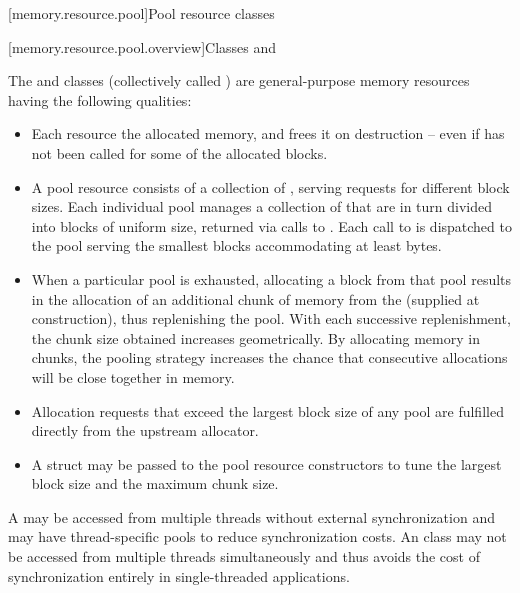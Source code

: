 [memory.resource.pool]{Pool resource classes}

[memory.resource.pool.overview]{Classes  and }

\pnum
The  and
 classes
(collectively called )
are general-purpose memory resources having the following qualities:
\begin{itemize}
\item
Each resource  the allocated memory, and frees it on destruction --
even if  has not been called for some of the allocated blocks.
\item
A pool resource consists of a collection of ,
serving requests for different block sizes.
Each individual pool manages a collection of 
that are in turn divided into blocks of uniform size,
returned via calls to .
Each call to  is dispatched
to the pool serving the smallest blocks accommodating at least  bytes.
\item
When a particular pool is exhausted,
allocating a block from that pool results in the allocation
of an additional chunk of memory from the 
(supplied at construction), thus replenishing the pool.
With each successive replenishment,
the chunk size obtained increases geometrically.
\enternote
By allocating memory in chunks,
the pooling strategy increases the chance that consecutive allocations
will be close together in memory.\exitnote
\item
Allocation requests that exceed the largest block size of any pool
are fulfilled directly from the upstream allocator.
\item
A  struct may be passed to the pool resource constructors
to tune the largest block size and the maximum chunk size.
\end{itemize}

\pnum
A  may be accessed from multiple threads
without external synchronization
and may have thread-specific pools to reduce synchronization costs.
An  class may not be accessed
from multiple threads simultaneously
and thus avoids the cost of synchronization entirely
in single-threaded applications.

